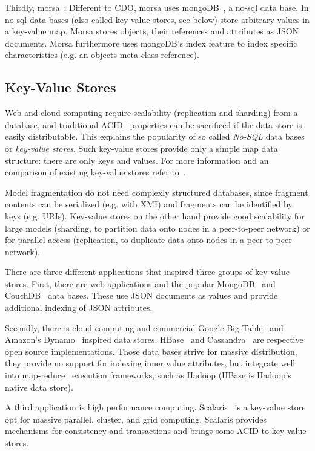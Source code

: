 Thirdly, morsa~\cite{morsa2011}: Different to CDO, morsa uses mongoDB~\cite{mongodb2010}, a no-sql data base. In no-sql data bases (also called key-value stores, see below) store arbitrary values in a key-value map. Morsa stores objects, their references and attributes as JSON documents. Morsa furthermore uses mongoDB's index feature to index specific characteristics (e.g. an objects meta-class reference).

\subsection{Key-Value Stores}

Web and cloud computing require scalability (replication and sharding) from a database, and traditional ACID~\cite{ACID} properties can be sacrificed if the data store is easily distributable. This explains the popularity of so called \emph{No-SQL} data bases or \emph{key-value stores}. Such key-value stores provide only a simple map data structure: there are only keys and values. For more information and an comparison of existing key-value stores refer to~\cite{nosql2010}.

Model fragmentation do not need complexly structured databases, since fragment contents can be serialized (e.g. with XMI) and fragments can be identified by keys (e.g. URIs). Key-value stores on the other hand provide good scalability for  large models (sharding, to partition data onto nodes in a peer-to-peer network) or for parallel access (replication, to duplicate data onto nodes in a peer-to-peer network).

There are three different applications that inspired three groups of key-value stores. First, there are web applications and the popular MongoDB~\cite{mongodb2010} and CouchDB~\cite{couchdb2010} data bases. These use JSON documents as values and provide additional indexing of JSON attributes.

Secondly, there is cloud computing and commercial Google Big-Table~\cite{bibtable2006} and Amazon's Dynamo~\cite{dynamo2007} inspired data stores. HBase~\cite{hbase2008} and Cassandra~\cite{cassandra2009} are respective open source implementations. Those data bases strive for massive distribution, they provide no support for indexing inner value attributes, but integrate well into map-reduce~\cite{mapreduce} execution frameworks, such as Hadoop (HBase is Hadoop's native data store). 

A third application is high performance computing. Scalaris~\cite{ScalarisTransactions2008} is a key-value store opt for massive parallel, cluster, and grid computing. Scalaris provides mechanisms for consistency and transactions and brings some ACID to key-value stores.